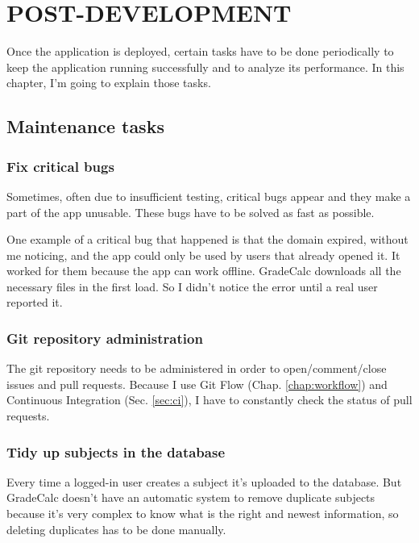 \chapter{POST-DEVELOPMENT}
\label{chap:post}

Once the application is deployed, certain tasks have to be done periodically to keep the application running successfully and to analyze its performance. In this chapter, I'm going to explain those tasks.

\section{Maintenance tasks}
\label{sec:mantenance}

\subsection{Fix critical bugs}

Sometimes, often due to insufficient testing, critical bugs appear and they make a part of the app unusable. These bugs have to be solved as fast as possible. 

One example of a critical bug that happened is that the domain expired, without me noticing, and the app could only be used by users that already opened it. It worked for them because the app can work offline. GradeCalc downloads all the necessary files in the first load. So I didn't notice the error until a real user reported it. 

\subsection{Git repository administration}

The git repository needs to be administered in order to open/comment/close issues and pull requests. Because I use Git Flow (Chap. \ref{chap:workflow}) and Continuous Integration (Sec. \ref{sec:ci}), I have to constantly check the status of pull requests.

\subsection{Tidy up subjects in the database}

Every time a logged-in user creates a subject it's uploaded to the database. But GradeCalc doesn't have an automatic system to remove duplicate subjects because it's very complex to know what is the right and newest information, so deleting duplicates has to be done manually.

